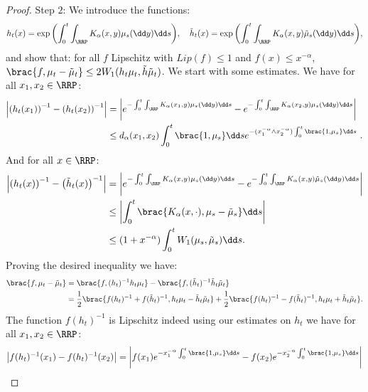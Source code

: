\begin{proof}
    Step $2$: We introduce the functions:
    \begin{align*}
        h_t(x) = \exp{\left(\int_0^t \int_{\RRP}K_\alpha(x,y) \mu_s(\dd y)\dd s \right)},\quad \tilde{h}_t(x) = \exp{\left(\int_0^t \int_{\RRP}K_\alpha(x,y)\tilde{\mu}_s(\dd y)\dd s \right)},
    \end{align*}
    and show that: for all $f$ Lipschitz with $Lip(f) \leq 1$ and $f(x) \leq x^{-\alpha}$, $\brac{f,\mu_t-\tilde{\mu}_t} \leq 2W_1(h_t\mu_t,\tilde{h}\tilde{\mu}_t)$. We start with some estimates. We have for all $x_1,x_2 \in \RRP$:
    \begin{align*}
        \left| \left(h_t(x_1)\right)^{-1} - \left(h_t(x_2)\right)^{-1}\right| &= \left| e^{-\int_0^t \int_{\RRP}K_\alpha(x_1,y) \mu_s(\dd y)\dd s } - e^{-\int_0^t \int_{\RRP}K_\alpha(x_2,y) \mu_s(\dd y)\dd s }\right| \\
        &\leq d_\alpha(x_1,x_2) \int_0^t \brac{1,\mu_s} \dd s e^{-(x_1^{-\alpha} \wedge x_2^{-\alpha})\int_0^t \brac{1,\mu_s} \dd s}\ .
    \end{align*}
    And for all $x \in \RRP$:
    \begin{align*}
        \left| \left(h_t(x)\right)^{-1} - \left(\tilde{h}_t(x)\right)^{-1}\right| 
        &= \left| e^{-\int_0^t \int_{\RRP}K_\alpha(x,y) \mu_s(\dd y)\dd s } - e^{-\int_0^t \int_{\RRP}K_\alpha(x,y) \tilde{\mu}_s(\dd y)\dd s }\right| \\
        &\leq \left|\int_0^t \brac{K_\alpha(x,\cdot),\mu_s - \tilde{\mu}_s} \dd s\right|  \\
        &\leq (1 + x^{-\alpha})\int_0^t W_1(\mu_s,\tilde{\mu}_s) \dd s.
    \end{align*}
    Proving the desired inequality we have:
    \begin{align*}
        \brac{f,\mu_t-\tilde{\mu}_t} &= \brac{f,(h_t)^{-1} h_t\mu_t} - \brac{f,(\tilde{h}_t)^{-1} \tilde{h}_t\tilde{\mu}_t} \\
        &= \dfrac12\brac{f(h_t)^{-1} + f(\tilde{h}_t)^{-1}, h_t\mu_t - \tilde{h}_t\tilde{\mu}_t} + \dfrac12\brac{f(h_t)^{-1} - f(\tilde{h}_t)^{-1},h_t\mu_t + \tilde{h}_t\tilde{\mu}_t}.
    \end{align*}
    The function $f(h_t)^{-1}$ is Lipschitz indeed using our estimates on $h_t$ we have for all $x_1,x_2 \in \RRP$:
    \begin{align*}
        \left| f(h_t)^{-1}(x_1) - f(h_t)^{-1}(x_2)\right| 
        &= \left| f(x_1)e^{-x_1^{-\alpha}\int_0^t \brac{1,\mu_s}\dd s } - f(x_2)e^{-x_2^{-\alpha}\int_0^t \brac{1,\mu_s}\dd s } \right| \\

\end{align*}
\end{proof}
